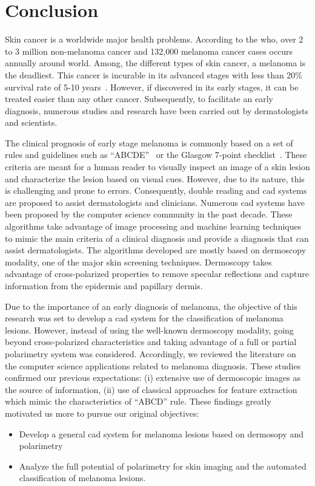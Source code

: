 \clearemptydoublepage
\acresetall

\chapter{Conclusion}
\label{chp:chapter6}
Skin cancer is a worldwide major health problems.
According to the \acf{who}, over 2 to 3 million non-melanoma cancer and 132,000 melanoma cancer cases occurs annually around world.
Among, the different types of skin cancer, a melanoma is the deadliest.
This cancer is incurable in its advanced stages with less than 20\% survival rate of 5-10 years~\cite{CancerFactsFigures2014}.
However, if discovered in its early stages, it can be treated easier than any other cancer.
Subsequently, to facilitate an early diagnosis, numerous studies and research have been carried out by dermatologists and scientists.

The clinical prognosis of early stage melanoma is commonly based on a set of rules and guidelines such as ``ABCDE''~\cite{abbasi2004early} or the Glasgow 7-point checklist~\cite{abbasi2004early}.
These criteria are meant for a human reader to visually inspect an image of a skin lesion and characterize the lesion based on visual cues.
However, due to its nature, this is challenging and prone to errors.
Consequently, double reading and \ac{cad} systems are proposed to assist dermatologists and clinicians.
Numerous \ac{cad} systems have been proposed by the computer science community in the past decade.
These algorithms take advantage of image processing and machine learning techniques to mimic the main criteria of a clinical diagnosis and provide a diagnosis that can assist dermatologists.
The algorithms developed are mostly based on dermoscopy modality, one of the major skin screening techniques.
Dermoscopy takes advantage of cross-polarized properties to remove specular reflections and capture information from the epidermis and papillary dermis. 

Due to the importance of an early diagnosis of melanoma, the objective of this research was set to develop a \ac{cad} system for the classification of melanoma lesions.
However, instead of using the well-known dermoscopy modality, going beyond cross-polarized characteristics and taking advantage of a full or partial polarimetry system was considered.
Accordingly, we reviewed the literature on the computer science applications related to melanoma diagnosis.
These studies confirmed our previous expectations: (i) extensive use of dermoscopic images as the source of information, (ii) use of classical approaches for feature extraction which mimic the characteristics of ``ABCD'' rule.
These findings greatly motivated us more to pursue our original objectives:
\begin{itemize}
\item Develop a general \acl{cad} system for melanoma lesions based on dermosopy and polarimetry
\item Analyze the full potential of polarimetry for skin imaging and the automated classification of melanoma lesions.
\end{itemize}

